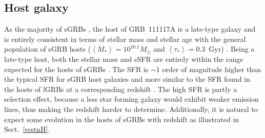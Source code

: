 \documentclass{aa}    %
\begin{document}

\subsection{Host galaxy}

As the majority of sGRBs \citep{Fong2013b}, the host of GRB~111117A is a
late-type galaxy and is entirely consistent in terms of stellar mass and stellar
age with the general population of sGRB hosts ($\left\langle M _*
\right\rangle = 10^{10.1} M_{\odot}$ and $\left\langle \tau _* \right\rangle =
0.3 $~Gyr) \citep{Leibler2010}. Being a late-type host, both the stellar mass
and sSFR are entirely within the range expected for the hosts of sGRBs
\citep{Behroozi2014}. The SFR is $\sim$1 order of magnitude higher than the
typical SFR for sGRB host galaxies \citep{Berger2014} and more similar to
the SFR found in the hosts of lGRBs at a corresponding redshift
\citep{Kruhler2015}. The high SFR is partly a selection effect, because a less
star forming galaxy would exhibit weaker emission lines, thus making the
redshift harder to determine. Additionally, it is natural to expect some
evolution in the hosts of sGRBs with redshift as illustrated in Sect.~\ref{restnH}. 


\end{document}
